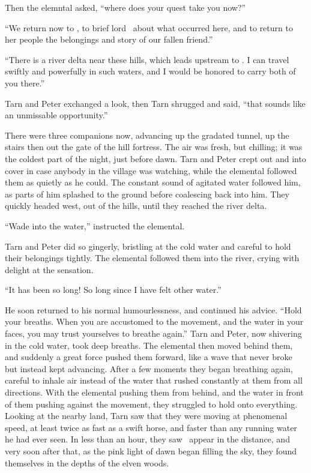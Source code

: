 Then the elemntal asked, ``where does your quest take you now?''

``We return now to \inarthonor, to brief lord \arilor\ about what occurred here, and to return to her people the belongings and story of our fallen friend.''

``There is a river delta near these hills, which leads upstream to \inarthonor.  I can travel swiftly and powerfully in such waters, and I would be honored to carry both of you there.''

Tarn and Peter exchanged a look, then Tarn shrugged and said, ``that sounds like an unmissable opportunity.''

There were three companions now, advancing up the gradated tunnel, up the stairs then out the gate of the hill fortress.  The air was fresh, but chilling; it was the coldest part of the night, just before dawn.  Tarn and Peter crept out and into cover in case anybody in the village was watching, while the elemental followed them as quietly as he could.  The constant sound of agitated water followed him, as parts of him splashed to the ground before coalescing back into him.  They quickly headed west, out of the hills, until they reached the river delta.

``Wade into the water,'' instructed the elemental.

Tarn and Peter did so gingerly, bristling at the cold water and careful to hold their belongings tightly.  The elemental followed them into the river, crying with delight at the sensation.

``It has been so long!  So long since I have felt other water.''

He soon returned to his normal humourlessness, and continued his advice.  ``Hold your breaths.  When you are accustomed to the movement, and the water in your faces, you may trust yourselves to breathe again.''  Tarn and Peter, now shivering in the cold water, took deep breaths.  The elemental then moved behind them, and suddenly a great force pushed them forward, like a wave that never broke but instead kept advancing.  After a few moments they began breathing again, careful to inhale air instead of the water that rushed constantly at them from all directions.  With the elemental pushing them from behind, and the water in front of them pushing against the movement, they struggled to hold onto everything.  Looking at the nearby land, Tarn saw that they were moving at phenomenal speed, at least twice as fast as a swift horse, and faster than any running water he had ever seen.  In less than an hour, they saw \inarthonor\ appear in the distance, and very soon after that, as the pink light of dawn began filling the sky, they found themselves in the depths of the elven woods.

